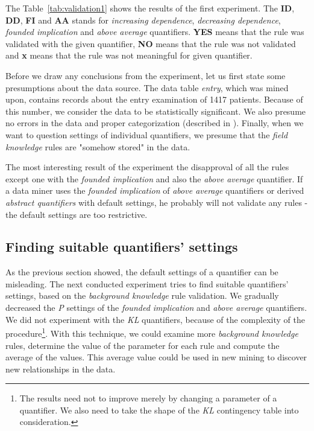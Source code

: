 \documentclass{llncs}
\begin{document}
The Table~\ref{tab:validation1} shows the results of the first experiment. The \textbf{ID},
\textbf{DD}, \textbf{FI} and \textbf{AA} stands for \emph{increasing dependence}, 
\emph{decreasing dependence}, \emph{founded implication} and \emph{above average}
quantifiers. \textbf{YES} means that the rule was validated with the given quantifier,
\textbf{NO} means that the rule was not validated and \textbf{x} means that the
rule was not meaningful for given quantifier.

Before we draw any conclusions from the experiment, let us first state some 
presumptions about the data source. The data table \emph{entry}, which was mined 
upon, contains records about the entry examination of 1417 patients. Because of
this number, we consider the data to be statistically significant. We also
presume no errors in the data and proper categorization (described in \cite{Diplomka}). 
Finally, when we want to question settings of individual quantifiers, we
presume that the \emph{field knowledge} rules are "somehow stored" in the data. 

The most interesting result of the experiment the disapproval of all the rules except
one with the \emph{founded implication} and also the \emph{above average}
quantifier. If a data miner uses the \emph{founded implication} of \emph{above
average} quantifiers or derived \emph{abstract quantifiers} with default settings,
he probably will not validate any rules - the default settings are too restrictive.

\subsection{Finding suitable quantifiers' settings}
As the previous section showed, the default settings of a quantifier can be
misleading. The next conducted experiment tries to find suitable quantifiers'
settings, based on the \emph{background knowledge} rule validation. We gradually
decreased the \emph{P} settings of the \emph{founded implication} and
\emph{above average} quantifiers. We did not experiment with the
\emph{KL} quantifiers, because of the complexity of the procedure\footnote{The 
results need not to improve merely by changing a parameter of a quantifier. 
We also need to take the shape of the \emph{KL} contingency table into consideration.}.
With this technique, we could examine more \emph{background knowledge} rules,
determine the value of the parameter for each rule and compute the average
of the values. This average value could be used in new mining to discover
new relationships in the data.
\end{document}
